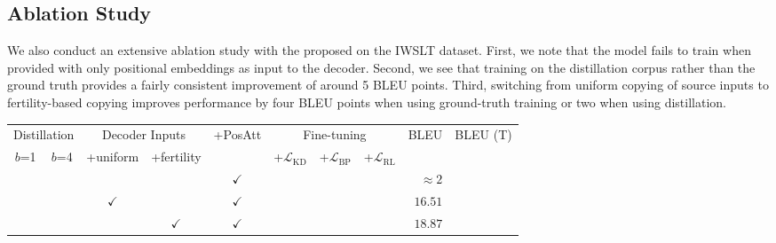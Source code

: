 \documentclass{article} \usepackage{iclr2018_conference,times}
\begin{document}
\subsection{Ablation Study}
We also conduct an extensive ablation study with the proposed \model{} on the IWSLT dataset. First, we note that the model fails to train when provided with only positional embeddings as input to the decoder. Second, we see that training on the distillation corpus rather than the ground truth provides a fairly consistent improvement of around 5 BLEU points. Third, switching from uniform copying of source inputs to fertility-based copying improves performance by four BLEU points when using ground-truth training or two when using distillation.



\begin{table}[h!]
\small\centering
\begin{tabular}{cc|ccc|ccc|rr}
\toprule
\multicolumn{2}{c|}{Distillation}  & 
\multicolumn{2}{c}{Decoder Inputs} & 
\multirow{2}[2]{*}{+PosAtt}  & 
\multicolumn{3}{|c|}{Fine-tuning} & 
\multirow{2}[2]{*}{BLEU} & 
\multirow{2}[2]{*}{BLEU (T)}\\
           
$b$=1 &
$b$=4 &
+uniform & 
\multicolumn{1}{c}{+fertility} 
& 
& 
\multicolumn{1}{|c}{+$\mathcal{L}_\text{KD}$}  & 
+$\mathcal{L}_\text{BP}$ & 
+$\mathcal{L}_\text{RL}$ &   &\\

\midrule 
& &              &              & $\checkmark$  & & & & $\approx 2$ \\
& & $\checkmark$ &              & $\checkmark$  & & & & $16.51$\\
& &              & $\checkmark$ & $\checkmark$  & & & & $18.87$\\
\midrule



\end{tabular}
\end{table}
\end{document}
